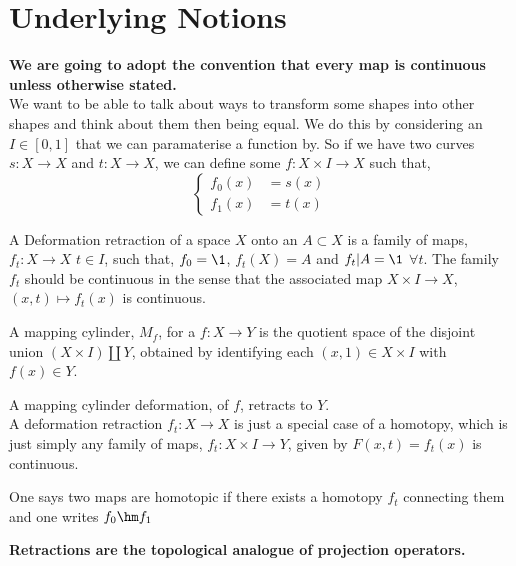 
\section{Underlying Notions}
{\centering \textbf{We are going to adopt the convention that every map is continuous unless otherwise stated.}}\\

\noindent
We want to be able to talk about ways to transform some shapes into other shapes and think about them then being equal. We do this by considering an $I \in [0, 1]$ that we can paramaterise a function by. So if we have two curves $s : X \to X$ and $t : X \to X$, we can define some $f : X \times I \to X$ such that,
$$ \begin{cases}
  f_0(x) &= s(x) \\
  f_1(x) &= t(x)
\end{cases} $$

\begin{ndefi}
  A Deformation retraction of a space $X$ onto an $A \subset X$ is a family of maps, $f_t : X \to X$ $t \in I$, such that, $f_0 = \1$, $f_t(X) = A$ and $f_t | A = \1$ $\forall t$. The family $f_t$ should be continuous in the sense that the associated map $X \times I \to X$, $(x, t) \mapsto f_t(x)$ is continuous.
\end{ndefi}

\begin{ndefi}
  A mapping cylinder, $M_f$, for a $f : X \to Y$ is the quotient space of the disjoint union $(X \times I)\coprod Y$, obtained by identifying each $(x, 1) \in X \times I$ with $f(x) \in Y$.
\end{ndefi}

A mapping cylinder deformation, of $f$, retracts to $Y$.\\

A deformation retraction $f_t : X \to X$ is just a special case of a homotopy, which is just simply any family of maps, $f_t : X \times I \to Y$, given by $F(x, t) = f_t (x)$ is continuous.

\begin{ndefi}[Homotopic]
  One says two maps are homotopic if there exists a homotopy $f_t$ connecting them and one writes $f_0 \hm f_1$
\end{ndefi}

\textbf{Retractions are the topological analogue of projection operators.}

